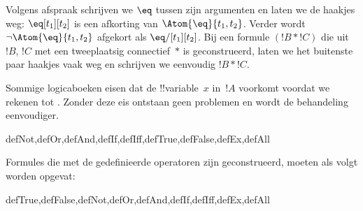 \documentclass[../../../include/open-logic-section]{subfiles}
\begin{document}
Volgens afspraak schrijven we $\eq$ tussen zijn argumenten en laten we
de haakjes weg: $\eq[t_1][t_2]$ is een afkorting van
$\Atom{\eq}{t_1,t_2}$. Verder wordt $\lnot \Atom{\eq}{t_1,t_2}$
afgekort als $\eq/[t_1][t_2]$. Bij een formule $(!B \ast !C)$ die uit
$!B$, $!C$ met een tweeplaatsig connectief~$\ast$ is geconstrueerd,
laten we het buitenste paar haakjes vaak weg en schrijven we eenvoudig
$!B \ast !C$.

\begin{intro}
Sommige logicaboeken eisen dat de !!{variable}~$x$ in~$!A$ voorkomt
voordat we
%
%
%
rekenen tot
.
Zonder deze eis ontstaan geen problemen en wordt de behandeling
eenvoudiger.
\end{intro}

\begin{tagblock}{defNot,defOr,defAnd,defIf,defIff,defTrue,defFalse,defEx,defAll}
\begin{defn}
Formules die met de gedefinieerde operatoren zijn geconstrueerd, moeten
als volgt worden opgevat:

\begin{tagenumerate}{defTrue,defFalse,defNot,defOr,defAnd,defIf,defIff,defEx,defAll}









\end{tagenumerate}
\end{defn}
\end{tagblock}
\end{document}
